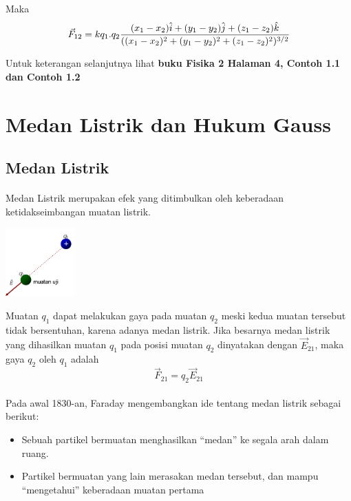 \documentclass[twocolumn, 11pt]{article}%
\begin{document}
        Maka 
        \begin{equation*}
                \vec F_{12}\\
                = k q_1.q_2 \frac{(x_1 - x_2)\hat i + (y_1 - y_2)\hat j + (z_1 - z_2)\hat k}{((x_1 - x_2)^2 + (y_1 - y_2)^2 + (z_1 - z_2)^2)^{3/2}}\\
        \end{equation*}

        Untuk keterangan selanjutnya lihat \textbf{buku Fisika 2 Halaman 4, Contoh 1.1 dan Contoh 1.2}


\section{Medan Listrik dan Hukum Gauss}
    \subsection{Medan Listrik}
        \paragraph{ } Medan Listrik merupakan efek yang ditimbulkan oleh keberadaan ketidakseimbangan muatan listrik.
        \begin{center}
            \includegraphics[width=100px]{0.png}
        \end{center}

        Muatan $q_1$ dapat melakukan gaya pada muatan $q_2$ meski kedua muatan tersebut tidak bersentuhan, karena adanya medan listrik. Jika besarnya medan listrik yang dihasilkan muatan $q_1$ pada posisi muatan $q_2$ dinyatakan dengan $\vec E_{21}$, maka gaya $q_2$ oleh $q_1$ adalah
        \[\vec F_{21} = q_2 \vec E_{21} \]\\
        
        Pada awal 1830-an, Faraday mengembangkan ide tentang medan listrik sebagai berikut:
        \begin{itemize}
            \item Sebuah partikel bermuatan menghasilkan “medan” ke segala arah dalam ruang.
            \item Partikel bermuatan yang lain merasakan medan tersebut, dan mampu “mengetahui” keberadaan muatan pertama
        \end{itemize}
\end{document}
